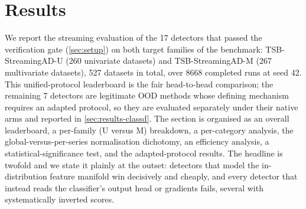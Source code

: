 
\section{Results}\label{sec:results}

We report the streaming evaluation of the \num{17} detectors that passed the
verification gate (\cref{sec:setup}) on both target families of the benchmark:
TSB-StreamingAD-U (\num{260} univariate datasets) and TSB-StreamingAD-M
(\num{267} multivariate datasets), \num{527} datasets in total, over \num{8668}
completed runs at seed \num{42}. This unified-protocol leaderboard is the fair
head-to-head comparison; the remaining \num{7} detectors are legitimate OOD methods
whose defining mechanism requires an adapted protocol, so they are evaluated
separately under their native arms and reported in \cref{sec:results-classd}. The
section is organised as an overall leaderboard, a per-family (U versus M) breakdown, a
per-category analysis, the global-versus-per-series normalisation dichotomy, an
efficiency analysis, a statistical-significance test, and the adapted-protocol
results. The headline is twofold and we state it plainly at the outset:
detectors that model the in-distribution feature manifold win decisively and
cheaply, and every detector that instead reads the classifier's output head or
gradients fails, several with systematically inverted scores.

